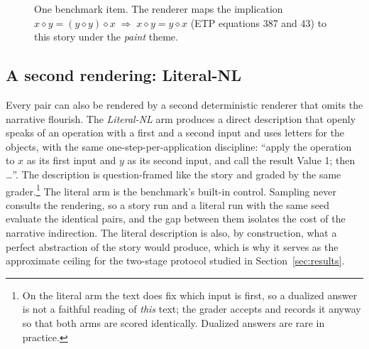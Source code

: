 \documentclass{article}
\begin{document}
\begin{figure}[t]
\centering
{}
\caption{One benchmark item. The renderer maps the implication
$x \diamond y = (y \diamond y) \diamond x \;\Rightarrow\;
x \diamond y = y \diamond x$ (ETP equations 387 and 43) to this story under
the \textit{paint} theme.}
\label{fig:benchmark-item}
\end{figure}
\subsection{A second rendering: Literal-NL}
Every pair can also be rendered by a second deterministic renderer that
omits the narrative flourish. The \textit{Literal-NL} arm produces a direct description
that openly speaks of an operation with a first and a second input and uses
letters for the objects, with the same one-step-per-application discipline:
``apply the operation to $x$ as its first input and $y$ as its second
input, and call the result Value 1; then \dots''. The description is
question-framed like the story and graded by the same grader.\footnote{On the literal arm
the text does fix which input is first, so a dualized answer is not a
faithful reading of \textit{this} text; the grader accepts and records it
anyway so that both arms are scored identically. Dualized answers are rare
in practice.}
The literal arm is the benchmark's built-in control. Sampling never
consults the rendering, so a story run and a literal run with the same seed
evaluate the identical pairs, and the gap between them isolates the cost of
the narrative indirection. The literal description is also, by
construction, what a perfect abstraction of the story would produce, which
is why it serves as the approximate ceiling for the two-stage protocol
studied in Section~\ref{sec:results}.
\end{document}
